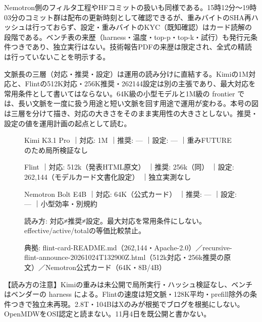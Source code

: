 \documentclass[lualatex,a4paper,10pt]{jlreq}
\begin{document}
Nemotron側のフィルタ工程やHFコミットの扱いも同様である。15時12分～19時03分のコミット群は配布の更新時刻として確認できるが、重みバイトのSHA再ハッシュは行っておらず、設定・重みバイトのKYC（既知確認）はカード読解の段階である。ベンチ表の来歴（harness・温度・top-p・top-k・試行）も発行元条件つきであり、独立実行はない。技術報告PDFの来歴は限定され、全式の精読は行っていないことを明示する。


文脈長の三層（対応・推奨・設定）は運用の読み分けに直結する。Kimiの1M対応と、Flintの512K対応・256K推奨・262144設定は別の主張であり、最大対応を常用条件として書いてはならない。64K級の小型モデルと1M級の frontier では、長い文脈を一度に扱う用途と短い文脈を回す用途で運用が変わる。本号の図は三層を分けて描き、対応の大きさをそのまま実用性の大きさとしない。推奨・設定の値を運用計画の起点として読む。


\begin{figure}[htbp]\centering
\begin{tcolorbox}[colback=SurveySoft,colframe=SurveyAccent,arc=1mm,boxrule=0.4pt,left=2mm,right=2mm,title={文脈長の三層（p1-f1、§1.3実物）}]
{\footnotesize 
Kimi K3.1 Pro ｜対応: 1M ｜推奨: — ｜設定: — ｜重みFUTUREのため局所検証なし\par
Flint ｜対応: 512k（発表HTML原文） ｜推奨: 256k（同） ｜設定: 262,144（モデルカード文書化設定） ｜独立実測なし\par
Nemotron Bolt E4B ｜対応: 64K（公式カード） ｜推奨: — ｜設定: — ｜小型効率・別規約\par
読み方: 対応≠推奨≠設定。最大対応を常用条件にしない。effective/active/totalの等価比較禁止。\par
典拠: flint-card-README.md（262,144・Apache-2.0）／recursive-flint-announce-20261024T132900Z.html（512k対応・256k推奨の原文）／Nemotron公式カード（64K・8B/4B）\par
\par}
\end{tcolorbox}
\end{figure}


\begin{tcolorbox}[colback=SurveySoft,colframe=SurveyRule,arc=1mm,boxrule=0.4pt,left=2mm,right=2mm]
【読み方の注意】Kimiの重みは未公開で局所実行・ハッシュ検証なし、ベンチはベンダーの harness による。Flintの速度は短文脈・128K平均・prefill除外の条件つきで独立未再現。2.8T・104BはXのみが根拠でブログを根拠にしない。OpenMDWをOSI認定と読まない。11月4日を既公開と書かない。

\end{tcolorbox}
\end{document}

